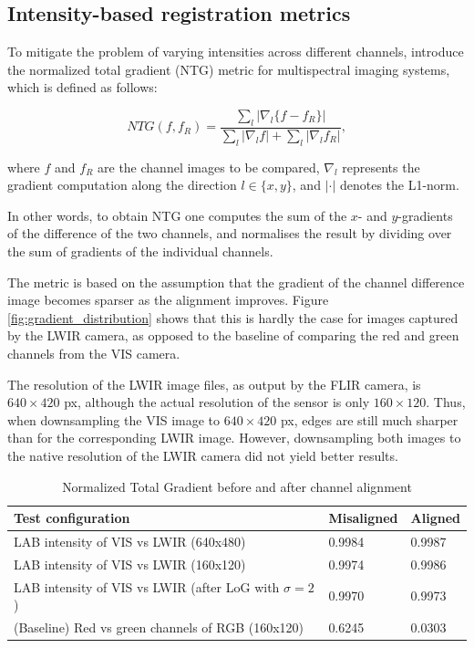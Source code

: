 \documentclass{l4proj}
\begin{document}
\subsection{Intensity-based registration metrics}

To mitigate the problem of varying intensities across different channels, \citet{chen_normalized_2018} introduce the normalized total gradient (NTG) metric for multispectral imaging systems, which is defined as follows:

\begin{equation}
  NTG(f, f_R) = \frac{\sum_l |\nabla_l \{f - f_R\}|}{\sum_l | \nabla_l f | + \sum_l | \nabla_l f_R|},
\end{equation}

where $f$ and $f_R$ are the channel images to be compared, $\nabla_l$ represents the gradient computation along the direction $l \in \{x, y\}$, and $| \cdot |$ denotes the L1-norm.

In other words, to obtain NTG one computes the sum of the $x$- and $y$-gradients of the difference of the two channels, and normalises the result by dividing over the sum of gradients of the individual channels.

The metric is based on the assumption that the gradient of the channel difference image becomes sparser as the alignment improves. Figure \ref{fig:gradient_distribution} shows that this is hardly the case for images captured by the LWIR camera, as opposed to the baseline of comparing the red and green channels from the VIS camera.

The resolution of the LWIR image files, as output by the FLIR camera, is $640 \times 420$ px, although the actual resolution of the sensor is only $160 \times 120$. Thus, when downsampling the VIS image to $640 \times 420$ px, edges are still much sharper than for the corresponding LWIR image. However, downsampling both images to the native resolution of the LWIR camera did not yield better results.

\begin{table}[ht]
  \centering
  \begin{tabular}{@{}lll@{}}
  \toprule
  \textbf{Test configuration}                             & \textbf{Misaligned} & \textbf{Aligned} \\ \midrule
  LAB intensity of VIS vs LWIR (640x480)     & 0.9984              & 0.9987           \\
  LAB intensity of VIS vs LWIR (160x120)    & 0.9974              & 0.9986           \\
  LAB intensity of VIS vs LWIR (after LoG with $\sigma=2$) & 0.9970              & 0.9973           \\
  (Baseline) Red vs green channels of RGB (160x120)                  & 0.6245              & 0.0303           \\ \bottomrule
  \end{tabular}
  \caption{Normalized Total Gradient before and after channel alignment}
  \label{table:registration_ntg}
\end{table}
\end{document}
